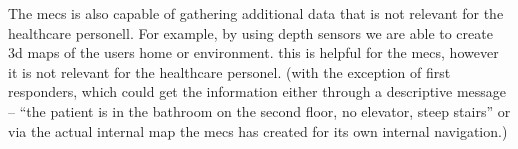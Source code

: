 The \gls{mecs} is also capable of gathering additional data that is not relevant for the healthcare personell. For example, by using depth sensors we are able to create 3d maps of the users home or environment. this is helpful for the \gls{mecs}, however it is not relevant for the healthcare personel. (with the exception of first responders, which could get the information either through a descriptive message -- ``the patient is in the bathroom on the second floor, no elevator, steep stairs'' or via the actual internal map the \gls{mecs} has created for its own internal navigation.)

